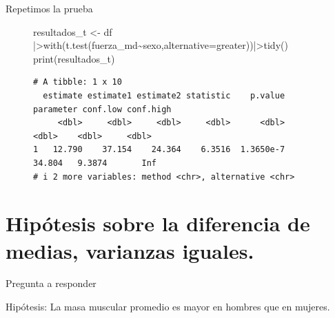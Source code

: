 \documentclass[
  ignorenonframetext,
]{beamer}
\newenvironment{Shaded}{\begin{snugshade}}{\end{snugshade}}
\newcommand{\AttributeTok}[1]{\textcolor[rgb]{0.40,0.45,0.13}{#1}}
\newcommand{\FunctionTok}[1]{\textcolor[rgb]{0.28,0.35,0.67}{#1}}
\newcommand{\NormalTok}[1]{\textcolor[rgb]{0.00,0.23,0.31}{#1}}
\newcommand{\OtherTok}[1]{\textcolor[rgb]{0.00,0.23,0.31}{#1}}
\newcommand{\SpecialCharTok}[1]{\textcolor[rgb]{0.37,0.37,0.37}{#1}}
\newcommand{\StringTok}[1]{\textcolor[rgb]{0.13,0.47,0.30}{#1}}
\begin{document}
\begin{frame}[fragile]{Repetimos la prueba}
\label{repetimos-la-prueba}
\begin{figure}

\begin{Shaded}
\begin{Highlighting}[]
\NormalTok{resultados\_t }\OtherTok{\textless{}{-}}\NormalTok{ df }\SpecialCharTok{|\textgreater{}}\FunctionTok{with}\NormalTok{(}\FunctionTok{t.test}\NormalTok{(fuerza\_md}\SpecialCharTok{\textasciitilde{}}\NormalTok{sexo,}\AttributeTok{alternative=}\StringTok{\textquotesingle{}greater\textquotesingle{}}\NormalTok{))}\SpecialCharTok{|\textgreater{}}\FunctionTok{tidy}\NormalTok{()}
\FunctionTok{print}\NormalTok{(resultados\_t)}
\end{Highlighting}
\end{Shaded}

\begin{verbatim}
# A tibble: 1 x 10
  estimate estimate1 estimate2 statistic    p.value parameter conf.low conf.high
     <dbl>     <dbl>     <dbl>     <dbl>      <dbl>     <dbl>    <dbl>     <dbl>
1   12.790    37.154    24.364    6.3516  1.3650e-7    34.804   9.3874       Inf
# i 2 more variables: method <chr>, alternative <chr>
\end{verbatim}

\end{figure}%
\end{frame}

\section{Hipótesis sobre la diferencia de medias, varianzas
iguales.}\label{hipuxf3tesis-sobre-la-diferencia-de-medias-varianzas-iguales.}

\begin{frame}{Pregunta a responder}
\label{pregunta-a-responder-1}
\begin{tcolorbox}[enhanced jigsaw, colbacktitle=quarto-callout-important-color!10!white, coltitle=black, title=\textcolor{quarto-callout-important-color}{\faExclamation}\hspace{0.5em}{Important}, breakable, bottomrule=.15mm, colback=white, toprule=.15mm, bottomtitle=1mm, toptitle=1mm, titlerule=0mm, rightrule=.15mm, arc=.35mm, leftrule=.75mm, colframe=quarto-callout-important-color-frame, opacitybacktitle=0.6, left=2mm, opacityback=0]

Hipótesis: La masa muscular promedio es mayor en hombres que en mujeres.

\end{tcolorbox}
\end{frame}
\end{document}
